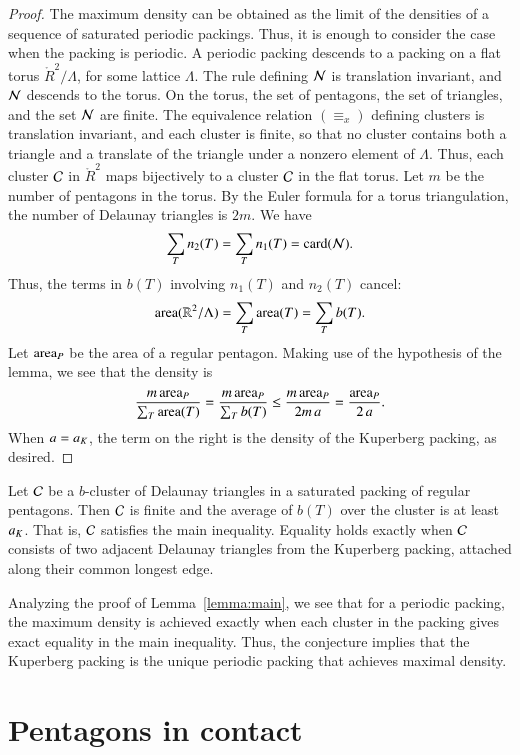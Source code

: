 \begin{proof} The maximum density can be obtained as the limit of the
  densities of a sequence of saturated periodic packings.  Thus, it is
  enough to consider the case when the packing is periodic.  A
  periodic packing descends to a packing on a flat torus
  $\ring{R}^2/\Lambda$, for some lattice $\Lambda$.  The rule defining
  $\mathcal N$ is translation invariant, and $\mathcal N$ descends to the torus.  On
  the torus, the set of pentagons, the set of triangles, and the set
  $\mathcal N$ are finite.  The equivalence relation $(\equiv_x)$ defining
  clusters is translation invariant, and each cluster is finite, so
  that no cluster contains both a triangle and a translate of the
  triangle under a nonzero element of $\Lambda$.  Thus, each cluster
  $\mathcal C$ in $\ring{R}^2$ maps bijectively to a cluster $\mathcal C$ in the flat
  torus.  Let $m$ be the number of pentagons in the torus.  By the
  Euler formula for a torus triangulation, the number of Delaunay
  triangles is $2m$.  We have
\[
\sum_{T} n_2(T) =  \sum_{T} n_1(T) = 
{\operatorname{card}}(\mathcal N).
\]
Thus, the terms in $b(T)$ involving $n_1(T)$ and $n_2(T)$ cancel:
\[
{\operatorname{area}}(\mathbb{R}^2/\Lambda) = \sum_T {\operatorname{area}}(T) = \sum_T b(T).
\]    
Let ${\operatorname{area}}_P$ be the area of a regular pentagon.  Making use of the
hypothesis of the lemma, we see that the density is
\[
\frac{m\, {\operatorname{area}}_P}{\sum_T {\operatorname{area}}(T)} 
=\frac{m\, {\operatorname{area}}_P}{\sum_T b(T)} \le\frac{m\, {\operatorname{area}}_P}{2 m\, a} 
= \frac{{\operatorname{area}}_P}{2\, a}.
\]
When $a=a_K$, the term on the right is the density of the Kuperberg
packing, as desired.
\end{proof}


\begin{conjecture}\label{conj:main}
  Let $\mathcal C$ be a $b$-cluster of Delaunay triangles in a saturated
  packing of regular pentagons.  Then $\mathcal C$ is finite and the average
  of $b(T)$ over the cluster is at least $a_K$.  That is, $\mathcal C$
  satisfies the main inequality.  Equality holds exactly when $\mathcal C$
  consists of two adjacent Delaunay triangles from the Kuperberg
  packing, attached along their common longest edge.
\end{conjecture}

Analyzing the proof of Lemma~\ref{lemma:main}, we see that for a
periodic packing, the maximum density is achieved exactly when each
 cluster in the packing gives exact equality in the main inequality.
Thus, the conjecture implies that the Kuperberg packing is the
unique periodic packing that achieves maximal density.


\section{Pentagons in contact}


